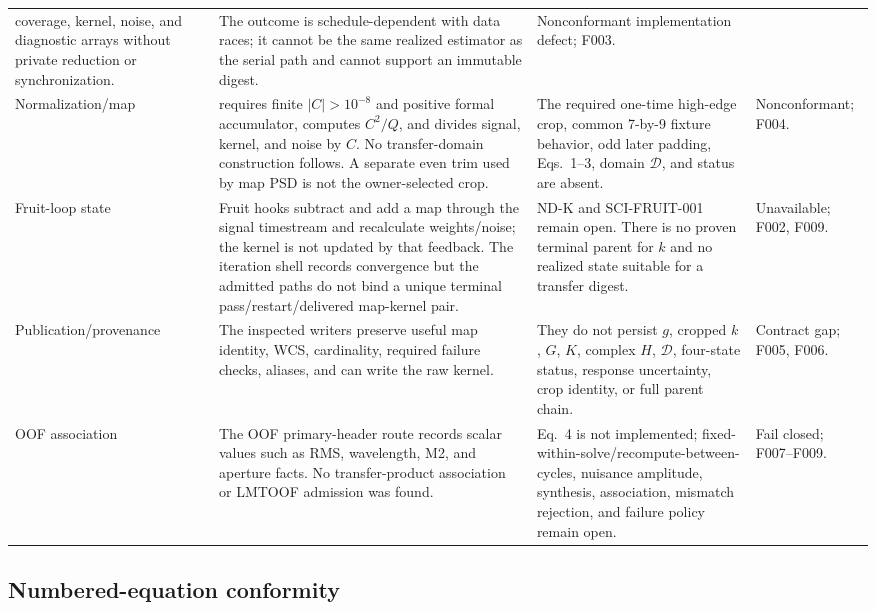 \documentclass[10pt]{article}
\newcommand{\code}[1]{\texttt{\detokenize{#1}}}
\begin{document}
\begin{longtable}{@{}L{0.135\textwidth}L{0.28\textwidth}L{0.30\textwidth}L{0.20\textwidth}@{}}
coverage, kernel, noise, and diagnostic arrays without private reduction or
synchronization. &
The outcome is schedule-dependent with data races; it cannot be the same
realized estimator as the serial path and cannot support an immutable digest. &
Nonconformant implementation defect; F003. \\
Normalization/map &
\code{normalize_maps} requires finite $|C|>10^{-8}$ and positive formal
accumulator, computes $C^2/Q$, and divides signal, kernel, and noise by $C$.
No transfer-domain construction follows.  A separate even trim used by map
PSD is not the owner-selected crop. &
The required one-time high-edge crop, common 7-by-9 fixture behavior, odd
later padding, Eqs.~1--3, domain $\mathcal D$, and status are absent. &
Nonconformant; F004. \\
Fruit-loop state &
Fruit hooks subtract and add a map through the signal timestream and
recalculate weights/noise; the kernel is not updated by that feedback.  The
iteration shell records convergence but the admitted paths do not bind a
unique terminal pass/restart/delivered map-kernel pair. &
ND-K and SCI-FRUIT-001 remain open.  There is no proven terminal parent for
$k$ and no realized state suitable for a transfer digest. &
Unavailable; F002, F009. \\
Publication/provenance &
The inspected writers preserve useful map identity, WCS, cardinality, required
failure checks, aliases, and can write the raw kernel. &
They do not persist $g$, cropped $k$, $G$, $K$, complex $H$, $\mathcal D$,
four-state status, response uncertainty, crop identity, or full parent chain. &
Contract gap; F005, F006. \\
OOF association &
The OOF primary-header route records scalar values such as RMS, wavelength,
M2, and aperture facts.  No transfer-product association or LMTOOF admission
was found. &
Eq.~4 is not implemented; fixed-within-solve/recompute-between-cycles,
nuisance amplitude, synthesis, association, mismatch rejection, and failure
policy remain open. &
Fail closed; F007--F009. \\
\bottomrule
\end{longtable}

\subsection{Numbered-equation conformity}
\end{document}

